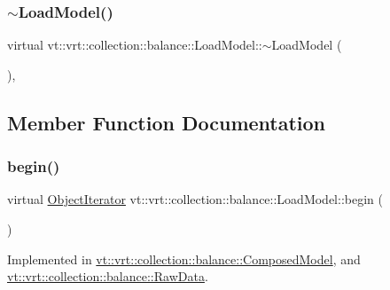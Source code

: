 \mbox{\label{classvt_1_1vrt_1_1collection_1_1balance_1_1_load_model_a6478a387f285b322a48ee1d8a80fc6f7}} 
\subsubsection{\texorpdfstring{$\sim$\+Load\+Model()}{~LoadModel()}}
{\footnotesize\ttfamily virtual vt\+::vrt\+::collection\+::balance\+::\+Load\+Model\+::$\sim$\+Load\+Model (\begin{DoxyParamCaption}{ }\end{DoxyParamCaption})\hspace{0.3cm}{\ttfamily [virtual]}, {\ttfamily [default]}}



\subsection{Member Function Documentation}
\mbox{\label{classvt_1_1vrt_1_1collection_1_1balance_1_1_load_model_a6ca139b4f14d79d1d59b46016efae221}} 
\subsubsection{\texorpdfstring{begin()}{begin()}}
{\footnotesize\ttfamily virtual \hyperlink{classvt_1_1vrt_1_1collection_1_1balance_1_1_object_iterator}{Object\+Iterator} vt\+::vrt\+::collection\+::balance\+::\+Load\+Model\+::begin (\begin{DoxyParamCaption}{ }\end{DoxyParamCaption})\hspace{0.3cm}{\ttfamily [pure virtual]}}



Implemented in \hyperlink{classvt_1_1vrt_1_1collection_1_1balance_1_1_composed_model_a8f34205887c08a22a1e5bef6ee358f2b}{vt\+::vrt\+::collection\+::balance\+::\+Composed\+Model}, and \hyperlink{structvt_1_1vrt_1_1collection_1_1balance_1_1_raw_data_a54351249212ade8b2d25a857e71b256f}{vt\+::vrt\+::collection\+::balance\+::\+Raw\+Data}.

